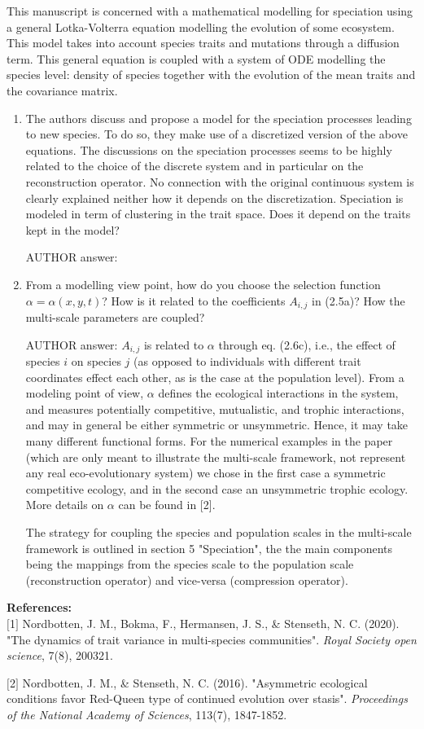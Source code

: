 \documentclass[a4paper,11pt]{scrartcl}
\begin{document}
This manuscript is concerned with a mathematical modelling for speciation using a general Lotka-Volterra equation modelling the evolution of some ecosystem. This model takes into account species traits and mutations through a diffusion term. This general equation is coupled with a system of ODE modelling the species level: density of species together with the evolution of the mean traits and the covariance matrix.

\begin{enumerate}
\item
The authors discuss and propose a model for the speciation processes leading to new species. To do so, they make use of a discretized version of the above equations. The discussions on the speciation processes seems to be highly related to the choice of the discrete system and in particular on the reconstruction operator. No connection with the original continuous system is clearly explained neither how it depends on the discretization.
Speciation is modeled in term of clustering in the trait space. Does it depend on the traits kept in the model?

AUTHOR answer:

\item
From a modelling view point, how do you choose the selection function $\alpha=\alpha(x,y,t)$? How is it related to the coefficients $A_{i,j}$ in (2.5a)? How the multi-scale parameters are coupled?

AUTHOR answer: $A_{i,j}$ is related to $\alpha$ through eq. (2.6c), i.e., the effect of species $i$ on species $j$ (as opposed to individuals with different trait coordinates effect each other, as is the case at the population level). From a modeling point of view, $\alpha$ defines the ecological interactions in the system, and measures potentially competitive, mutualistic, and trophic interactions, and may in general be either symmetric or unsymmetric. Hence, it may take many different functional forms. For the numerical examples in the paper (which are only meant to illustrate the multi-scale framework, not represent any real eco-evolutionary system) we chose in the first case a symmetric competitive ecology, and in the second case an unsymmetric trophic ecology. More details on $\alpha$ can be found in [2].

The strategy for coupling the species and population scales in the multi-scale framework is outlined in section 5 "Speciation", the the main components being the mappings from the species scale to the population scale (reconstruction operator) and vice-versa (compression operator).
\end{enumerate}

\textbf{References:}\\

$[$1$]$ Nordbotten, J. M., Bokma, F., Hermansen, J. S., \& Stenseth, N. C. (2020). "The dynamics of trait variance in multi-species communities". \textit{Royal Society open science}, 7(8), 200321. 

$[$2$]$ Nordbotten, J. M., \& Stenseth, N. C. (2016). "Asymmetric ecological conditions favor Red-Queen type of continued evolution over stasis". \textit{Proceedings of the National Academy of Sciences}, 113(7), 1847-1852.
\end{document}
